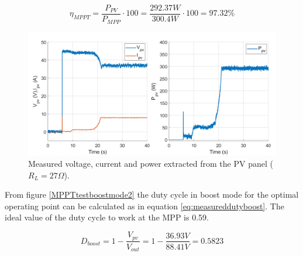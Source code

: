 \begin{equation} \label{eq:effMPPTboost}
\eta_{MPPT}= \dfrac{P_{PV}}{P_{MPP}} \cdot 100 = \dfrac{292.37W}{300.4W} \cdot 100 = 97.32\%  
\end{equation}


\begin{figure}[H]
	\begin{center}
		\includegraphics[width=1\textwidth]{../Pictures/P1/Test/Boost_mode_MPPT_Vin_Iin_Pin}
		\caption{Measured voltage, current and power extracted from the PV panel ($R_{L}=27\Omega$).}
		\label{MPPTtestboostmode1}
	\end{center}	
\end{figure}



From figure \ref{MPPTtestboostmode2} the duty cycle in boost mode for the optimal operating point can be calculated as in equation \ref{eq:measureddutyboost}. The ideal value of the duty cycle to work at the MPP is 0.59.

\begin{equation} \label{eq:measureddutyboost}
D_{boost}= 1 - \dfrac{V_{pv}}{V_{out}} = 1 - \dfrac{36.93V}{88.41V} = 0.5823
\end{equation}

